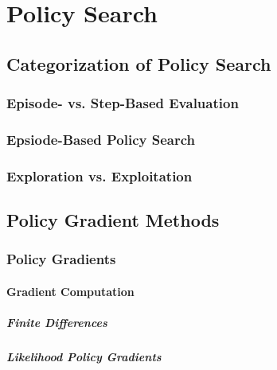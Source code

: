 \chapter{Policy Search} %
	\label{c:policySearch}


	\section{Categorization of Policy Search} %

		\subsection{Episode- vs. Step-Based Evaluation} %

		\subsection{Epsiode-Based Policy Search} %

		\subsection{Exploration vs. Exploitation} %

	\section{Policy Gradient Methods} %

		\subsection{Policy Gradients} %

			\subsubsection{Gradient Computation} %

				\paragraph{Finite Differences} %

				\paragraph{Likelihood Policy Gradients} %

